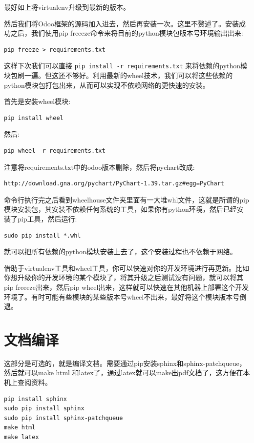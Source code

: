 \documentclass[11pt,a4paper]{sphinxmanual}
\begin{document}
最好如上将virtualenv升级到最新的版本。

然后我们将Odoo框架的源码加入进去，然后再安装一次。这里不赘述了。安装成功之后，我们使用pip freeeze命令来将目前的python模块包版本号环境输出出来:

\begin{verbatim}
pip freeze > requirements.txt
\end{verbatim}

这样下次我们可以直接 \verb~pip install -r requirements.txt~ 来将依赖的python模块包刷一遍。但这还不够好。利用最新的wheel技术，我们可以将这些依赖的python模块包打包出来，从而可以实现不依赖网络的更快速的安装。

首先是安装wheel模块:
\begin{verbatim}
pip install wheel
\end{verbatim}

然后:
\begin{verbatim}
pip wheel -r requirements.txt
\end{verbatim}

注意将requirements.txt中的odoo版本删除，然后将pychart改成:
\begin{Verbatim}
http://download.gna.org/pychart/PyChart-1.39.tar.gz#egg=PyChart
\end{Verbatim}

命令行执行完之后看到wheelhouse文件夹里面有一大堆whl文件，这就是所谓的pip模块安装包，其安装不依赖任何系统的工具，如果你有python环境，然后已经安装了pip工具，然后运行:
\begin{Verbatim}
sudo pip install *.whl
\end{Verbatim}

就可以把所有依赖的python模块安装上去了，这个安装过程也不依赖于网络。

借助于virtualenv工具和wheel工具，你可以快速对你的开发环境进行再更新。比如你想升级你的开发环境的某个模块了，将其升级之后测试没有问题，就可以将其pip freeeze出来，然后pip wheel出来，这样就可以快速在其他机器上部署这个开发环境了。有时可能有些模块的某些版本号wheel不出来，最好将这个模块版本号倒退。





\section{文档编译}
\label{sec-3-7}
这部分是可选的，就是编译文档。需要通过pip安装sphinx和sphinx-patchqueue，然后就可以make html 和latex了，通过latex就可以make出pdf文档了，这方便在本机上查阅资料。
\begin{Verbatim}
pip install sphinx
sudo pip install sphinx
sudo pip install sphinx-patchqueue
make html
make latex
\end{Verbatim}
\end{document}
